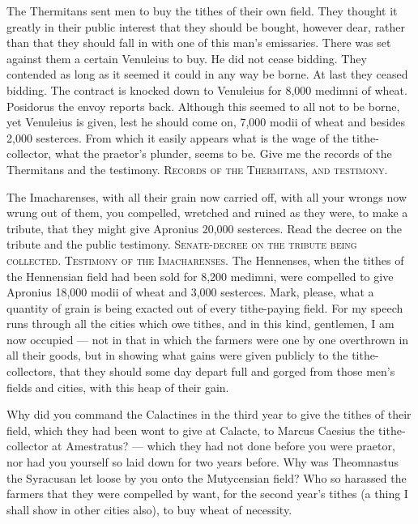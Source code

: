  The Thermitans sent men to buy the tithes of their own field. They thought it greatly in their public interest that they should be bought, however dear, rather than that they should fall in with one of this man's emissaries. There was set against them a certain Venuleius to buy. He did not cease bidding. They contended as long as it seemed it could in any way be borne. At last they ceased bidding. The contract is knocked down to Venuleius for 8,000 medimni of wheat. Posidorus the envoy reports back. Although this seemed to all not to be borne, yet Venuleius is given, lest he should come on, 7,000 modii of wheat and besides 2,000 sesterces. From which it easily appears what is the wage of the tithe-collector, what the praetor's plunder, seems to be. Give me the records of the Thermitans and the testimony. \textsc{Records of the Thermitans, and testimony}.

 The Imacharenses, with all their grain now carried off, with all your wrongs now wrung out of them, you compelled, wretched and ruined as they were, to make a tribute, that they might give Apronius 20,000 sesterces. Read the decree on the tribute and the public testimony. \textsc{Senate-decree on the tribute being collected. Testimony of the Imacharenses}. The Hennenses, when the tithes of the Hennensian field had been sold for 8,200 medimni, were compelled to give Apronius 18,000 modii of wheat and 3,000 sesterces. Mark, please, what a quantity of grain is being exacted out of every tithe-paying field. For my speech runs through all the cities which owe tithes, and in this kind, gentlemen, I am now occupied --- not in that in which the farmers were one by one overthrown in all their goods, but in showing what gains were given publicly to the tithe-collectors, that they should some day depart full and gorged from those men's fields and cities, with this heap of their gain.

 Why did you command the Calactines in the third year to give the tithes of their field, which they had been wont to give at Calacte, to Marcus Caesius the tithe-collector at Amestratus? --- which they had not done before you were praetor, nor had you yourself so laid down for two years before. Why was Theomnastus the Syracusan let loose by you onto the Mutycensian field? Who so harassed the farmers that they were compelled by want, for the second year's tithes (a thing I shall show in other cities also), to buy wheat of necessity.

